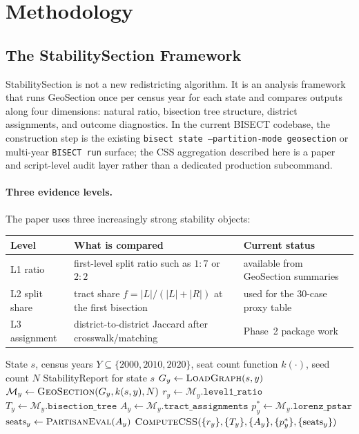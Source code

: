 \section{Methodology}
\label{sec:methodology}

\subsection{The StabilitySection Framework}

StabilitySection is not a new redistricting algorithm.
It is an analysis framework that runs GeoSection once per census year for
each state and compares outputs along four dimensions:
natural ratio, bisection tree structure, district assignments, and outcome
diagnostics.
In the current BISECT codebase, the construction step is the existing
\texttt{bisect state --partition-mode geosection} or multi-year
\texttt{BISECT run} surface; the CSS aggregation described here is a paper
and script-level audit layer rather than a dedicated production subcommand.

\paragraph{Three evidence levels.}
The paper uses three increasingly strong stability objects:
\begin{center}
\small
\begin{tabular}{p{} p{} p{}}
\toprule
Level & What is compared & Current status \\
\midrule
L1 ratio & first-level split ratio such as $1:7$ or $2:2$ & available from GeoSection summaries \\
L2 split share & tract share $f=|L|/(|L|+|R|)$ at the first bisection & used for the 30-case proxy table \\
L3 assignment & district-to-district Jaccard after crosswalk/matching & Phase~2 package work \\
\bottomrule
\end{tabular}
\end{center}

\begin{algorithm}
\caption{StabilitySection}
\label{alg:stabilitysection}
\begin{algorithmic}[1]
\Require State $s$, census years $Y \subseteq \{2000, 2010, 2020\}$,
         seat count function $k(\cdot)$, seed count $N$
\Ensure StabilityReport for state $s$
  \State $G_y \gets \textsc{LoadGraph}(s, y)$ 
  \State $\mathcal{M}_y \gets \textsc{GeoSection}(G_y, k(s, y), N)$
  \State $r_y \gets \mathcal{M}_y.\texttt{level1\_ratio}$
  \State $T_y \gets \mathcal{M}_y.\texttt{bisection\_tree}$
  \State $A_y \gets \mathcal{M}_y.\texttt{tract\_assignments}$
  \State $p^*_y \gets \mathcal{M}_y.\texttt{lorenz\_pstar}$
  \State $\text{seats}_y \gets \textsc{PartisanEval}(A_y)$
\EndFor
\State \Return $\textsc{ComputeCSS}(\{r_y\}, \{T_y\}, \{A_y\}, \{p^*_y\}, \{\text{seats}_y\})$
\end{algorithmic}
\end{algorithm}

